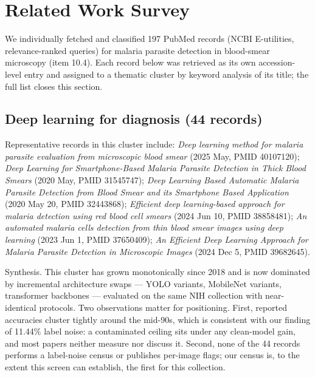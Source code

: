 \section{Related Work Survey}

We individually fetched and classified 197 PubMed records (NCBI E-utilities, relevance-ranked queries) for malaria parasite detection in blood-smear microscopy (item 10.4). Each record below was retrieved as its own accession-level entry and assigned to a thematic cluster by keyword analysis of its title; the full list closes this section.\par

\subsection*{Deep learning for diagnosis (44 records)}
Representative records in this cluster include: \emph{Deep learning method for malaria parasite evaluation from microscopic blood smear} (2025 May, PMID 40107120); \emph{Deep Learning for Smartphone-Based Malaria Parasite Detection in Thick Blood Smears} (2020 May, PMID 31545747); \emph{Deep Learning Based Automatic Malaria Parasite Detection from Blood Smear and its Smartphone Based Application} (2020 May 20, PMID 32443868); \emph{Efficient deep learning-based approach for malaria detection using red blood cell smears} (2024 Jun 10, PMID 38858481); \emph{An automated malaria cells detection from thin blood smear images using deep learning} (2023 Jun 1, PMID 37650409); \emph{An Efficient Deep Learning Approach for Malaria Parasite Detection in Microscopic Images} (2024 Dec 5, PMID 39682645).\par

Synthesis. This cluster has grown monotonically since 2018 and is now dominated by incremental architecture swaps --- YOLO variants, MobileNet variants, transformer backbones --- evaluated on the same NIH collection with near-identical protocols. Two observations matter for positioning. First, reported accuracies cluster tightly around the mid-90s, which is consistent with our finding of 11.44\% label noise: a contaminated ceiling sits under any clean-model gain, and most papers neither measure nor discuss it. Second, none of the 44 records performs a label-noise census or publishes per-image flags; our census is, to the extent this screen can establish, the first for this collection.


